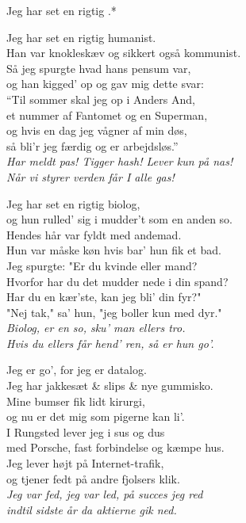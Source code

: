 \begin{song}{Jeg har set en rigtig .*}
  \begin{SBVerse}
    Jeg har set en rigtig humanist.\\
    Han var knokleskæv og sikkert også kommunist.\\
    Så jeg spurgte hvad hans pensum var,\\
    og han kigged’ op og gav mig dette svar:\\
    ``Til sommer skal jeg op i Anders And,\\
    et nummer af Fantomet og en Superman,\\
    og hvis en dag jeg vågner af min døs,\\
    så bli’r jeg færdig og er arbejdsløs.''\\
    \emph{Har meldt pas! Tigger hash! Lever kun på nas!\\
    Når vi styrer verden får I alle gas!}
  \end{SBVerse}

  \begin{SBVerse}
    Jeg har set en rigtig biolog,\\
    og hun rulled’ sig i mudder’t som en anden so.\\
    Hendes hår var fyldt med andemad.\\
    Hun var måske køn hvis bar’ hun fik et bad.\\
    Jeg spurgte: "Er du kvinde eller mand?\\
    Hvorfor har du det mudder nede i din spand?\\
    Har du en kær’ste, kan jeg bli’ din fyr?"\\
    "Nej tak," sa’ hun, "jeg boller kun med dyr."\\
    \emph{Biolog, er en so, sku’ man ellers tro.\\
    Hvis du ellers får hend’ ren, så er hun go’.}
  \end{SBVerse}

  \begin{SBVerse}
    Jeg er go’, for jeg er datalog.\\
    Jeg har jakkesæt \& slips \& nye gummisko.\\
    Mine bumser fik lidt kirurgi,\\
    og nu er det mig som pigerne kan li’.\\
    I Rungsted lever jeg i sus og dus\\
    med Porsche, fast forbindelse og kæmpe hus.\\
    Jeg lever højt på Internet-trafik,\\
    og tjener fedt på andre fjolsers klik.\\
    \emph{Jeg var fed, jeg var led, på succes jeg red\\
    indtil sidste år da aktierne gik ned.}
  \end{SBVerse}
\end{song}